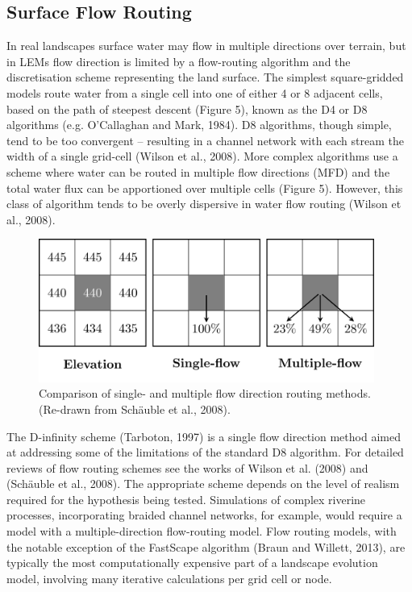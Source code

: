 \subsection{Surface Flow Routing}
In real landscapes surface water may flow in multiple directions over terrain, but in LEMs flow direction is limited by a flow-routing algorithm and the discretisation scheme representing the land surface. The simplest square-gridded models route water from a single cell into one of either 4 or 8 adjacent cells, based on the path of steepest descent (Figure 5), known as the D4 or D8 algorithms (e.g. O’Callaghan and Mark, 1984). D8 algorithms, though simple, tend to be too convergent – resulting in a channel network with each stream the width of a single grid-cell (Wilson et al., 2008). More complex algorithms use a scheme where water can be routed in multiple flow directions (MFD) and the total water flux can be apportioned over multiple cells (Figure 5).  However, this class of algorithm tends to be overly dispersive in water flow routing (Wilson et al., 2008).  

\begin{figure}[t]
\includegraphics[width=11cm]{LEMFinalRevisedmanuscriptDAVFinalrevisions-img/LEMFinalRevisedmanuscriptDAVFinalrevisions-img006.png} 
\caption{Comparison of single- and multiple flow direction routing methods. (Re-drawn from Schäuble et al., 2008).}
\label{fig_LEM_flow_routing}
\end{figure}

The D-infinity scheme (Tarboton, 1997) is a single flow direction method aimed at addressing some of the limitations of the standard D8 algorithm. For detailed reviews of flow routing schemes see the works of Wilson et al. (2008) and (Schäuble et al., 2008). The appropriate scheme depends on the level of realism required for the hypothesis being tested. Simulations of complex riverine processes, incorporating braided channel networks, for example, would require a model with a multiple-direction flow-routing model.\- Flow routing models, with the notable exception of the FastScape algorithm (Braun and Willett, 2013), are typically the most computationally expensive part of a landscape evolution model, involving many iterative calculations per grid cell or node.

